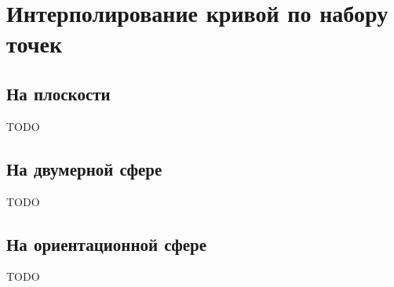 \section{Интерполирование кривой по набору точек}

\subsection*{На плоскости}

TODO

\subsection*{На двумерной сфере}

TODO

\subsection*{На ориентационной сфере}

TODO
